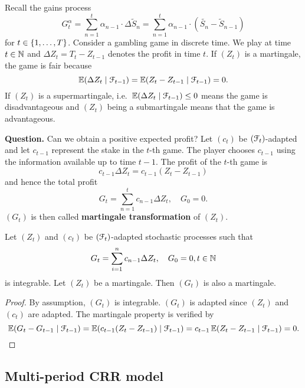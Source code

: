 \documentclass[12pt]{amsart}
\begin{document}
\begin{remark}
    Recall the gains process \[
        G_t^\alpha = \sum_{n=1}^t \alpha_{n-1} \cdot \Delta \tilde{S}_n = \sum_{n=1}^t \alpha_{n-1} \cdot (\tilde{S_n}-\tilde{S}_{n-1})
    \]
    for \(t \in \left\{ 1, \dots, T \right\}\). Consider a gambling game in discrete time. We play at time \(t \in \mathbb{N}\) and \(\Delta Z_t = T_t - Z_{t-1}\) denotes the profit in time \(t\). If \((Z_t)\) is a martingale, the game is fair because \[
        \operatorname{\mathbb{E}}(\Delta Z_t \mid \mathcal{F}_{t-1}) = \operatorname{\mathbb{E}}(Z_t - Z_{t-1} \mid \mathcal{F}_{t-1}) = 0.
    \]
    If \((Z_t)\) is a supermartingale, i.e.\ \(\operatorname{\mathbb{E}}(\Delta Z_t \mid \mathcal{F}_{t-1}) \leq 0\) means the game is disadvantageous and \((Z_t)\) being a submartingale means that the game is advantageous.
\end{remark}

\textbf{Question.} Can we obtain a positive expected profit?
Let \((c_t)\) be \((\mathcal{F}_t)\)-adapted and let \(c_{t-1}\) represent the stake in the \(t\)-th game. The player chooses \(c_{t-1}\) using the information available up to time \(t-1\). The profit of the \(t\)-th game is \[
    c_{t-1} \Delta Z_t = c_{t-1} (Z_t-Z_{t-1})
\]
and hence the total profit \[
    G_t = \sum_{n=1}^t c_{n-1} \Delta Z_t , \quad G_0=0.
\]
\((G_t)\) is then called \textbf{martingale transformation} of \((Z_t)\).

\begin{theorem}
    Let \((Z_t)\) and \((c_t)\) be \((\mathcal{F}_t)\)-adapted stochastic processes such that\[
        G_t = \sum_{i=1}^n c_{n-1} \Delta Z_t, \quad G_0=0, t \in \mathbb{N}
    \]
    is integrable. Let \((Z_t)\) be a martingale. Then \((G_t)\) is also a martingale.
\end{theorem}
\begin{proof}
    By assumption, \((G_t)\) is integrable. \((G_t)\) is adapted since \((Z_t)\) and \((c_t)\) are adapted. The martingale property is verified by \[
        \operatorname{\mathbb{E}}(G_t-G_{t-1} \mid \mathcal{F}_{t-1}) = \operatorname{\mathbb{E}}(c_{t-1}(Z_t-Z_{t-1}) \mid \mathcal{F}_{t-1}) = c_{t-1} \operatorname{\mathbb{E}}(Z_t-Z_{t-1}\mid \mathcal{F}_{t-1}) = 0.
    \]
\end{proof}

\subsection{Multi-period CRR model}
\end{document}
